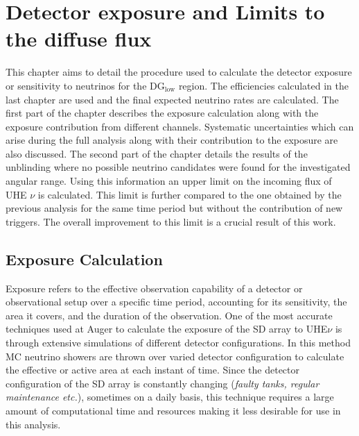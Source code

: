 
\chapter{Detector exposure and Limits to the diffuse flux}
\label{sec:align}
 
This chapter aims to detail the procedure used to calculate the detector exposure or sensitivity to neutrinos for the DG$\mathrm{_{low}}$ region. The efficiencies calculated in the last chapter are used and the final expected neutrino rates are calculated. The first part of the chapter describes the exposure calculation along with the exposure contribution from different channels. Systematic uncertainties which can arise during the full analysis along with their contribution to the exposure are also discussed. 
The second part of the chapter details the results of the unblinding where no possible neutrino candidates were found for the investigated angular range. Using this information an upper limit on the incoming flux of UHE $\nu$ is calculated. This limit is further compared to the one obtained by the previous analysis for the same time period but without the contribution of new triggers. The overall improvement to this limit is a crucial result of this work. 


\section{Exposure Calculation}
\label{sec:det_exposure_calc}

Exposure refers to the effective observation capability of a detector or observational setup over a specific time period, accounting for its sensitivity, the area it covers, and the duration of the observation. One of the most accurate techniques used at Auger to calculate the exposure of the SD array to UHE$\nu$ is through extensive simulations of different detector configurations. In this method MC neutrino showers are thrown over varied detector configuration to calculate the effective or active area at each instant of time. Since the detector configuration of the SD array is constantly changing (\textit{faulty tanks, regular maintenance etc.}), sometimes on a daily basis, this technique requires a large amount of computational time and resources making it less desirable for use in this analysis. 

